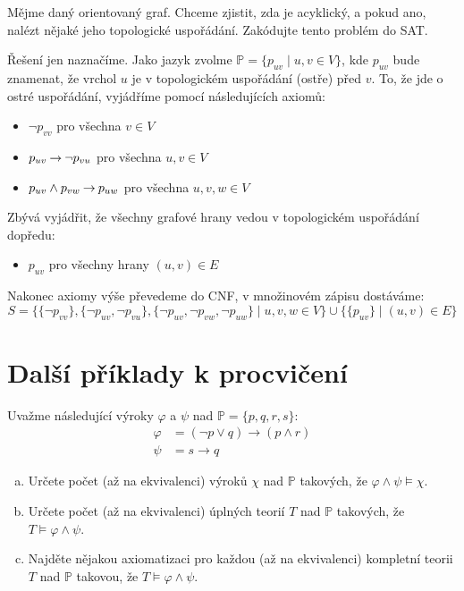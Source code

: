 \begin{problem}

    Mějme daný orientovaný graf. Chceme zjistit, zda je acyklický, a pokud ano, nalézt nějaké jeho topologické uspořádání. Zakódujte tento problém do SAT.

    \begin{solution}
        Řešení jen naznačíme. Jako jazyk zvolme $\mathbb P=\{p_{uv}\mid u,v\in V\}$, kde $p_{uv}$ bude znamenat, že vrchol $u$ je v topologickém uspořádání (ostře) před $v$. To, že jde o ostré uspořádání, vyjádříme pomocí následujících axiomů:
        \begin{itemize}
            \item $\neg p_{vv}$ pro všechna $v\in V$
            \item $p_{uv}\mathbin{\rightarrow}\neg p_{vu}$ pro všechna $u,v\in V$
            \item $p_{uv}\land p_{vw}\mathbin{\rightarrow} p_{uw}$ pro všechna $u,v,w\in V$
        \end{itemize}
        Zbývá vyjádřit, že všechny grafové hrany vedou v topologickém uspořádání dopředu:
        \begin{itemize}
            \item $p_{uv}$ pro všechny hrany $(u,v)\in E$
        \end{itemize}
        Nakonec axiomy výše převedeme do CNF, v množinovém zápisu dostáváme:
        $$
        S=\{\{\neg p_{vv}\},\{\neg p_{uv},\neg p_{vu}\},\{\neg p_{uv},\neg p_{vw},\neg p_{uw}\} \mid u,v,w\in V\}\cup\{\{p_{uv}\}\mid(u,v)\in E\}
        $$
    \end{solution}

\end{problem}
    
    
\section*{Další příklady k procvičení}
    

\begin{problem}

    Uvažme následující výroky $\varphi$ a $\psi$ nad $\mathbb P=\{p, q, r, s\}$:
    \begin{align*}
        \varphi &= (\neg p \vee  q)\to(p\wedge r)\\
        \psi &= s\to q
    \end{align*}
    \begin{enumerate}[(a)]
        \item Určete počet (až na ekvivalenci) výroků $\chi$ nad $\mathbb P$ takových, že $\varphi\wedge\psi\models\chi$.
        \item Určete počet (až na ekvivalenci) úplných teorií $T$ nad $\mathbb P$ takových, že $T\models\varphi\wedge\psi$.
        \item Najděte nějakou axiomatizaci pro každou (až na ekvivalenci) kompletní teorii $T$ nad $\mathbb P$ takovou, že $T\models\varphi\wedge\psi$.
    \end{enumerate}

\end{problem}


